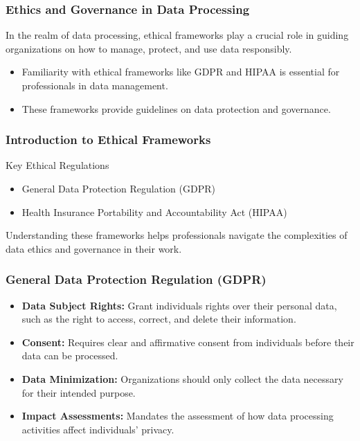 \documentclass[aspectratio=169]{beamer}
\begin{document}
\begin{frame}[fragile]
    \frametitle{Ethics and Governance in Data Processing}
    In the realm of data processing, ethical frameworks play a crucial role in guiding organizations on how to manage, protect, and use data responsibly. 
    \begin{itemize}
        \item Familiarity with ethical frameworks like GDPR and HIPAA is essential for professionals in data management.
        \item These frameworks provide guidelines on data protection and governance.
    \end{itemize}
\end{frame}

\begin{frame}[fragile]
    \frametitle{Introduction to Ethical Frameworks}
    \begin{block}{Key Ethical Regulations}
        \begin{itemize}
            \item General Data Protection Regulation (GDPR)
            \item Health Insurance Portability and Accountability Act (HIPAA)
        \end{itemize}
    \end{block}
    Understanding these frameworks helps professionals navigate the complexities of data ethics and governance in their work.
\end{frame}

\begin{frame}[fragile]
    \frametitle{General Data Protection Regulation (GDPR)}
    \begin{itemize}
        \item \textbf{Data Subject Rights:} Grant individuals rights over their personal data, such as the right to access, correct, and delete their information.
        \item \textbf{Consent:} Requires clear and affirmative consent from individuals before their data can be processed.
        \item \textbf{Data Minimization:} Organizations should only collect the data necessary for their intended purpose.
        \item \textbf{Impact Assessments:} Mandates the assessment of how data processing activities affect individuals' privacy.
    \end{itemize}
\end{frame}
\end{document}
